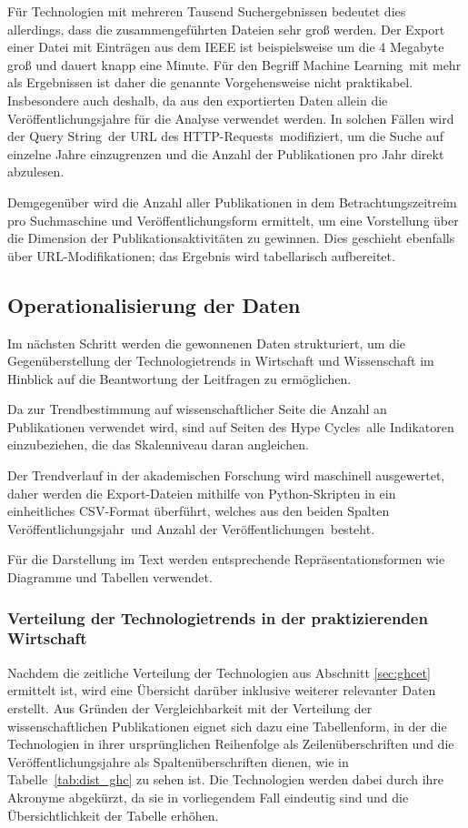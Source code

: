 Für Technologien mit mehreren Tausend Such\-ergebnissen bedeutet dies allerdings, dass die zusammengeführten Dateien sehr groß werden. Der Export einer Datei mit  Einträgen aus dem IEEE ist beispielsweise um die 4 Megabyte groß und dauert knapp eine Minute. Für den Begriff \glqq Machine Learning\grqq~mit mehr als  Ergebnissen ist daher die genannte Vorgehensweise nicht praktikabel. Insbesondere auch deshalb, da aus den exportierten Daten allein die Veröffentlichungsjahre für die Analyse verwendet werden. In solchen Fällen wird der \glqq Query String\grqq~der URL des \glqq HTTP-Requests\grqq~modifiziert, um die Suche auf einzelne Jahre einzugrenzen und die Anzahl der Publikationen pro Jahr direkt abzulesen.

Demgegenüber wird die Anzahl aller Publikationen in dem Betrachtungszeitreim pro Suchmaschine und Veröffentlichungsform ermittelt, um eine Vorstellung über die Dimension der Publikations\-aktivitäten zu gewinnen. Dies geschieht ebenfalls über URL-Modifikationen; das Ergebnis wird tabellarisch aufbereitet.

\subsection{Operationalisierung der Daten}
Im nächsten Schritt werden die gewonnenen Daten strukturiert, um die Gegenüberstellung der Technologietrends in Wirtschaft und Wissenschaft im Hinblick auf die Beantwortung der Leitfragen zu ermöglichen.

Da zur Trendbestimmung auf wissenschaftlicher Seite die Anzahl an Publikationen verwendet wird, sind auf Seiten des \glqq Hype Cycles\grqq~alle Indikatoren einzubeziehen, die das Skalenniveau daran angleichen.

Der Trendverlauf in der akademischen Forschung wird maschinell ausgewertet, daher werden die Export-Dateien mithilfe von Python-Skripten in ein einheitliches CSV-Format überführt, welches aus den beiden Spalten \glqq Veröffentlichungsjahr\grqq~und \glqq Anzahl der Veröffentlichungen\grqq~besteht.

Für die Darstellung im Text werden entsprechende Repräsentationsformen wie Diagramme und Tabellen verwendet.

\subsubsection{Verteilung der Technologietrends in der praktizierenden Wirtschaft}
Nachdem die zeitliche Verteilung der Technologien aus Abschnitt \ref{sec:ghcet} ermittelt ist, wird eine Übersicht darüber inklusive weiterer relevanter Daten erstellt. Aus Gründen der Vergleichbarkeit mit der Verteilung der wissenschaftlichen Publikationen eignet sich dazu eine Tabellenform, in der die Technologien in ihrer ursprünglichen Reihenfolge als Zeilenüberschriften und die Veröffentlichungsjahre als Spaltenüberschriften dienen, wie in Tabelle~\ref{tab:dist_ghc} zu sehen ist. Die Technologien werden dabei durch ihre Akronyme abgekürzt, da sie in vorliegendem Fall eindeutig sind und die Übersichtlichkeit der Tabelle erhöhen.

